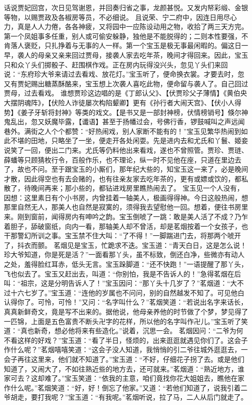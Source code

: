\documentclass[12pt,oneside]{book}
\begin{document}
话说贾妃回宫，次日见驾谢恩，并回奏归省之事，龙颜甚悦。又发内帑彩缎、金银等物，以赐贾政及各椒房等员，不必细说。
且说荣、宁二府中，因连日用尽心力，真是人人力倦，各各神疲，又将园中一应陈设动用之物，收拾了两三天方完。第一个凤姐事多任重，别人或可偷安躲静，独他是不能脱得的；二则本性要强，不肯落人褒贬，只扎挣着与无事的人一样。第一个宝玉是极无事最闲暇的。偏这日一早，袭人的母亲又亲来回过贾母，接袭人家去吃年茶，晚间才得回来。因此，宝玉只和众丫头们掷骰子、赶围棋作戏。正在房内玩得没兴头，忽见丫头们来回说：“东府珍大爷来请过去看戏、放花灯。”宝玉听了，便命换衣裳。才要去时，忽又有贾妃赐出糖蒸酥酪来，宝玉想上次袭人喜吃此物，便命留与袭人了。自己回过贾母，过去看戏。
谁想贾珍这边唱的是《丁郎认父》、【伏贾珍父子薄情】《黄伯央大摆阴魂阵》，【伏险人诈徒屡次构陷颦卿】更有《孙行者大闹天宫》、【伏小人得势】《姜子牙斩将封神》等类的戏文。【是书又是一部封神榜，伏情榜销号】倏尔神鬼乱出，忽又妖魔毕露，【谶语】甚至于扬幡过会，号佛行香，锣鼓喊叫之声远闻巷外。满街之人个个都赞：“好热闹戏，别人家断不能有的！”宝玉见繁华热闹到如此不堪的田地，只略坐了一坐，便走开各处闲耍。先是进内去和尤氏和丫鬟、姬妾说笑了一回，便出二门来。尤氏等仍料他出来看戏，遂也不曾照管。贾珍、贾琏、薛蟠等只顾猜枚行令，百般作乐，也不理论，纵一时不见他在座，只道在里边去了，故也不问。至于跟宝玉的小厮们，那年纪大些的，知宝玉这一来了，必是晚间才散，因此得空也有去会赌的，也有往亲友家去吃年茶的，更有或嫖或饮的，都私散了，待晚间再来；那小些的，都钻进戏房里瞧热闹去了。
宝玉见一个人没有，因想：这里素日有个小书房，内曾挂着一轴美人，极画得得神。今日这般热闹，想那里自然无人，那美人也自然是寂寞的，须得我去望慰他一回。想着，便往书房里来。刚到窗前，闻得房内有呻吟之韵。宝玉倒唬了一跳：敢是美人活了不成？乃乍着胆子，舔破窗纸，向内一看，那轴美人却不曾活，却是茗烟按着一个女孩子，也干那警幻所训之事。宝玉禁不住大叫：“了不得！”一脚踹进门去，将那两个唬开了，抖衣而颤。
茗烟见是宝玉，忙跪求不迭。宝玉道：“青天白日，这是怎么说！珍大爷知道，你是死是活？”一面看那丫头，虽不标致，倒还白净，些微亦有动人之处，羞得脸红耳赤，低头无言。宝玉跺脚道：“还不快跑！”一语提醒了那丫头，飞也似去了。宝玉又赶出去，叫道：“你别怕，我是不告诉人的！”急得茗烟在后叫：“祖宗，这是分明告诉人了！”宝玉因问：“那丫头十几岁了？”茗烟道：“大不过十六七岁了。”宝玉道：“连他的岁属也不问问，别的自然越发不知了。可见他白认得你了。可怜，可怜！”又问：“名字叫什么？”茗烟笑道：“若说出名字来话长，真真新鲜奇文，竟是写不出来的。据他说，他母亲养他的时节做了个梦，梦见得了一匹锦，上面是五色富贵不断头卍字的花样，所以他的名字叫作卍儿。”宝玉听了笑道：“真也新奇，想必他将来有些造化。”说着，沉思一会。
茗烟因问：“二爷为何不看这样的好戏？”宝玉道：“看了半日，怪烦的，出来逛逛就遇见你们了。这会子作什么呢？”茗烟嘻嘻笑道：“这会子没人知道，我悄悄的引二爷往城外逛逛去，一会子再往这里来，他们就不知道了。”宝玉道：“不好，仔细花子拐了去。或是他们知道了，又闹大了，不如往熟近些的地方去，还可就来。”茗烟道：“熟近地方，谁家可去？这却难了。”宝玉笑道：“依我的主意，咱们竟找你花大姐姐去，瞧他在家作什么呢。”茗烟笑道：“好，好！倒忘了他家。”又道：“若他们知道了，说我引着二爷胡走，要打我呢？”宝玉道：“有我呢。”茗烟听说，拉了马，二人从后门就走了。
\end{document}
